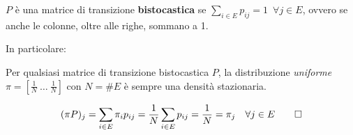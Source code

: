 \begin{defn}\label{def-bistoc}
	$P$ è una matrice di transizione \textbf{bistocastica} se $\sum_{i \in E} p_{ij} = 1 \enspace \forall j \in E$, ovvero se anche le colonne, oltre alle righe, sommano a 1.
\end{defn}
In particolare:
\begin{prop}
	Per qualsiasi matrice di transizione bistocastica $P$, la distribuzione \emph{uniforme} $\pi = [\frac 1 N \ \dots \ \frac 1 N]$ con $N=\#E$ è sempre una densità stazionaria.
\end{prop}
\begin{dimo}
	$$(\pi P)_j = \sum_{i \in E} \pi_i p_{ij} = \frac 1 N \sum_{i \in E} p_{ij} = \frac 1 N = \pi_j
	\quad \forall j \in E \qedhere$$
\end{dimo}

